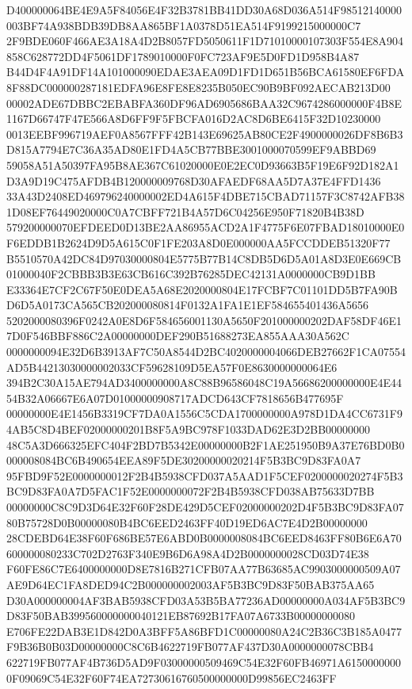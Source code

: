\documentclass[UTF8,fontset=fandol,zihao=-4,a4paper]{ctexart}
\begin{document}
{{D400000064BE4E9A5F84056E4F32B3781BB41DD30A68D036A514F98512140000003BF74A938BDB39DB8AA865BF1A0378D51EA514F9199215000000C7
2F9BDE060F466AE3A18A4D2B8057FD5050611F1D71010000107303F554E8A904858C628772DD4F5061DF1789010000F0FC723AF9E5D0FD1D958B4A87
B44D4F4A91DF14A101000090EDAE3AEA09D1FD1D651B56BCA61580EF6FDA8F88DC000000287181EDFA96E8FE8E8235B050EC90B9BF092AECAB213D00
00002ADE67DBBC2EBABFA360DF96AD6905686BAA32C9674286000000F4B8E1167D66747F47E566A8D6FF9F5FBCFA016D2AC8D6BE6415F32D10230000
0013EEBF996719AEF0A8567FFF42B143E69625AB80CE2F4900000026DF8B6B3D815A7794E7C36A35AD80E1FD4A5CB77BBE3001000070599EF9ABBD69
59058A51A50397FA95B8AE367C61020000E0E2EC0D93663B5F19E6F92D182A1D3A9D19C475AFDB4B120000009768D30AFAEDF68AA5D7A37E4FFD1436
33A43D2408ED469796240000002ED4A615F4DBE715CBAD71157F3C8742AFB381D08EF76449020000C0A7CBFF721B4A57D6C04256E950F71820B4B38D
579200000070EFDEED0D13BE2AA86955ACD2A1F4775F6E07FBAD18010000E0F6EDDB1B2624D9D5A615C0F1FE203A8D0E000000AA5FCCDDEB51320F77
B5510570A42DC84D97030000804E5775B77B14C8DB5D6D5A01A8D3E0E669CB01000040F2CBBB3B3E63CB616C392B76285DEC42131A0000000CB9D1BB
E33364E7CF2C67F50E0DEA5A68E2020000804E17FCBF7C01101DD5B7FA90BD6D5A0173CA565CB202000080814F0132A1FA1E1EF584655401436A5656
5202000080396F0242A0E8D6F584656001130A5650F201000000202DAF58DF46E17D0F546BBF886C2A00000000DEF290B51688273EA855AAA30A562C
0000000094E32D6B3913AF7C50A8544D2BC4020000004066DEB27662F1CA07554AD5B44213030000002033CF59628109D5EA57F0E8630000000064E6
394B2C30A15AE794AD3400000000A8C88B96586048C19A56686200000000E4E4454B32A06667E6A07D01000000908717ADCD643CF7818656B477695F
00000000E4E1456B3319CF7DA0A1556C5CDA1700000000A978D1DA4CC6731F94AB5C8D4BEF02000000201B8F5A9BC978F1033DAD62E3D2BB00000000
48C5A3D666325EFC404F2BD7B5342E00000000B2F1AE251950B9A37E76BD0B0000008084BC6B490654EEA89F5DE30200000020214F5B3BC9D83FA0A7
95FBD9F52E0000000012F2B4B5938CFD037A5AAD1F5CEF0200000020274F5B3BC9D83FA0A7D5FAC1F52E0000000072F2B4B5938CFD038AB75633D7BB
00000000C8C9D3D64E32F60F28DE429D5CEF02000000202D4F5B3BC9D83FA0780B75728D0B00000080B4BC6EED2463FF40D19ED6AC7E4D2B00000000
28CDEBD64E38F60F686BE57E6ABD0B0000008084BC6EED8463FF80B6E6A70600000080233C702D2763F340E9B6D6A98A4D2B0000000028CD03D74E38
F60FE86C7E6400000000D8E7816B271CFB07AA77B63685AC9903000000509A07AE9D64EC1FA8DED94C2B000000002003AF5B3BC9D83F50BAB375AA65
D30A000000004AF3BAB5938CFD03A53B5BA77236AD00000000A034AF5B3BC9D83F50BAB399560000000040121EB87692B17FA07A6733B00000000080
E706FE22DAB3E1D842D0A3BFF5A86BFD1C00000080A24C2B36C3B185A0477F9B36B0B03D00000000C8C6B4622719FB077AF437D30A0000000078CBB4
622719FB077AF4B736D5AD9F03000000509469C54E32F60FB46971A61500000000F09069C54E32F60F74EA72730616760500000000D99856EC2463FF
}}
\end{document}
